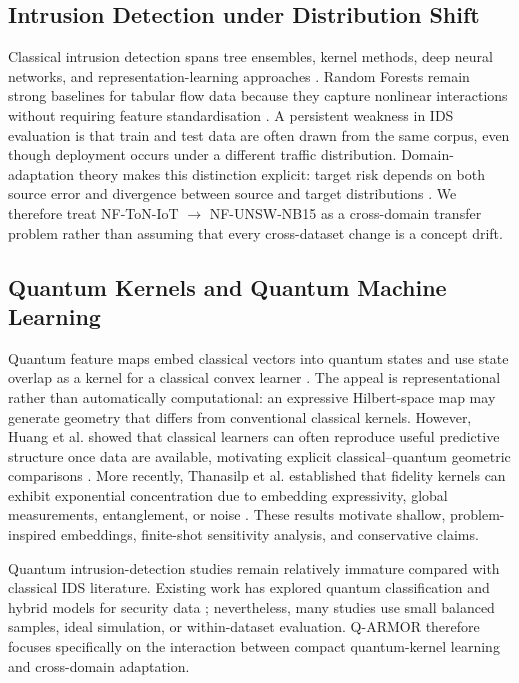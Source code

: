 \documentclass[conference]{IEEEtran}
\begin{document}
\subsection{Intrusion Detection under Distribution Shift}

Classical intrusion detection spans tree ensembles, kernel methods, deep
neural networks, and representation-learning approaches \cite{liao2013}.
Random Forests remain strong baselines for tabular flow data because they
capture nonlinear interactions without requiring feature standardisation
\cite{breiman2001}. A persistent weakness in IDS evaluation is that train
and test data are often drawn from the same corpus, even though deployment
occurs under a different traffic distribution. Domain-adaptation theory
makes this distinction explicit: target risk depends on both source error
and divergence between source and target distributions \cite{bendavid2010}.
We therefore treat NF-ToN-IoT $\to$ NF-UNSW-NB15 as a cross-domain
transfer problem rather than assuming that every cross-dataset change is a
concept drift.

\subsection{Quantum Kernels and Quantum Machine Learning}

Quantum feature maps embed classical vectors into quantum states and use
state overlap as a kernel for a classical convex learner
\cite{havlicek2019, schuld2019}. The appeal is representational rather
than automatically computational: an expressive Hilbert-space map may
generate geometry that differs from conventional classical kernels.
However, Huang et al. showed that classical learners can often reproduce
useful predictive structure once data are available, motivating explicit
classical--quantum geometric comparisons \cite{huang2021}. More recently,
Thanasilp et al. established that fidelity kernels can exhibit exponential
concentration due to embedding expressivity, global measurements,
entanglement, or noise \cite{thanasilp2024}. These results motivate
shallow, problem-inspired embeddings, finite-shot sensitivity analysis,
and conservative claims.

Quantum intrusion-detection studies remain relatively immature compared
with classical IDS literature. Existing work has explored quantum
classification and hybrid models for security data \cite{kalinin2022};
nevertheless, many studies use small balanced samples, ideal simulation,
or within-dataset evaluation. Q-ARMOR therefore focuses specifically on
the interaction between compact quantum-kernel learning and cross-domain
adaptation.
\end{document}
